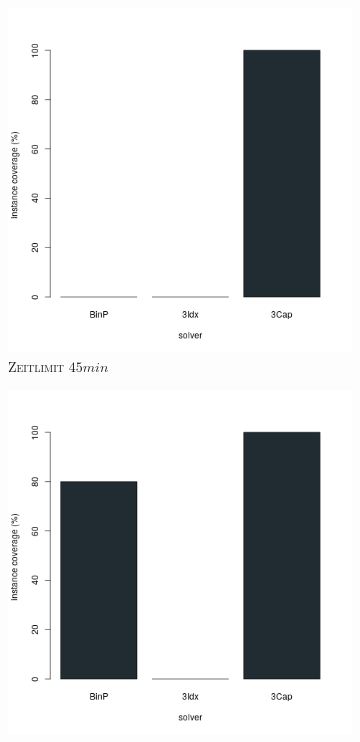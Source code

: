\begin{figure}[H]
\centering

\begin{subfigure}[b]{0.3\textwidth}
\centering
\includegraphics[width=1.2\textwidth]{img/solver_instance_coverage_b=3_l_2700s.png}
\caption{\textsc{Zeitlimit} $45min$}
\label{fig:instance_coverage_b=3_l_a}
\end{subfigure}
\hfill
\begin{subfigure}[b]{0.3\textwidth}
\centering
\includegraphics[width=1.2\textwidth]{img/solver_instance_coverage_b=3_l_5400s.png}

\end{subfigure}
\end{figure}
